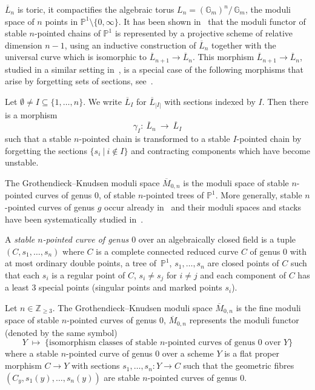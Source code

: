\documentclass[ALCO,ThmDefs,Unicode,epreuves]{cedram}
\def\Z{\mathds Z}
\def\G{\mathds G}
\def\P{\mathds P}
\begin{document}
$\overline{L}_n$ is toric, it compactifies the algebraic torus 
$L_n=(\G_m)^n/\,\G_m$, the moduli space of $n$ points in $\P^1\setminus\{0,\infty\}$.
It has been shown in~\cite{LM00} that the moduli functor of 
stable $n$-pointed chains of $\P^1$ is represented by a projective scheme 
of relative dimension $n-1$, using an inductive construction of 
$\overline{L}_n$ together with the universal curve which is isomorphic to
$\overline{L}_{n+1}\to\overline{L}_n$.
This morphism $\overline{L}_{n+1}\to\overline{L}_n$, studied in a similar 
setting in~\cite{Kn83}, is a special case of the following morphisms that 
arise by forgetting sets of sections, see~\cite[Construction~3.15]{BB11}.

\begin{prop} 
Let $\emptyset\neq I\subseteq\{1,\ldots,n\}$. We write $\overline{L}_I$ 
for $\overline{L}_{|I|}$ with sections indexed by $I$. Then there is a morphism
\[
\gamma_I\colon\:\overline{L}_n\:\to\:\overline{L}_I
\]
such that a stable $n$-pointed chain is transformed to a stable $I$-pointed
chain by forgetting the sections $\{s_i\:|\:i\not\in I\}$ and contracting 
components which have become unstable.
\end{prop}

The Grothendieck--Knudsen moduli space $\overline{M}_{0,n}$ is the 
moduli space of stable $n$-pointed curves of genus $0$, \ie of 
stable $n$-pointed trees of $\P^1$.
More generally, stable $n$-pointed curves of genus $g$ occur already 
in~\cite[I.5]{SGA7-1} and their moduli spaces and stacks 
have been systematically studied in~\cite{Kn83}.

\begin{defi}
A {\it stable $n$-pointed curve of genus $0$} over an algebraically closed 
field is a tuple $(C,s_1,\ldots,s_n)$ where $C$ is a complete 
connected reduced curve $C$ of genus $0$ with at most ordinary double points, 
\ie a tree of $\,\P^1\!$, $s_1,\ldots,s_n$ are closed points of $C$ 
such that each $s_i$ is a regular point of $C$, $s_i\neq s_j$ for $i\neq j$ 
and each component of $C$ has a least $3$ special points (\ie singular points
and marked points $s_i$).
\end{defi}

\begin{defithm}[\cite{Kn83}]
Let $n\in\Z_{\geq3}$. The Grothendieck--Knudsen moduli space $\overline{M}_{0,n}$ 
is the fine moduli space of stable $n$-pointed curves of genus $0$, 
\ie $\overline{M}_{0,n}$ represents the moduli functor (denoted by the same symbol)
\[ 
Y\;\mapsto\;\Big\{\text{isomorphism classes of stable $n$-pointed curves 
of genus $0$ over $Y$}\Big\}
\]
where a stable $n$-pointed curve of genus $0$ over a scheme $Y$ is a 
flat proper morphism $C\to Y$ with sections $s_1,\ldots,s_n\colon Y\to C$ 
such that the geometric fibres $(C_y,s_1(y),\ldots,s_n(y))$ are 
stable $n$-pointed curves of genus $0$. 
\end{defithm}
\end{document}

